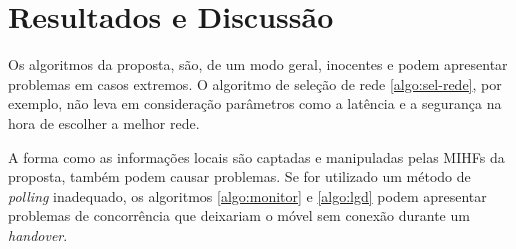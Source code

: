 \documentclass[12pt]{article}
\begin{document}
\section{Resultados e Discussão}

Os algoritmos da proposta, são, de um modo geral, inocentes e podem apresentar 
problemas em casos extremos. O algoritmo de seleção de rede 
\ref{algo:sel-rede}, por exemplo, não leva em consideração parâmetros como a 
latência e a segurança na hora de escolher a melhor rede.

A forma como as informações locais são captadas e manipuladas pelas MIHFs da 
proposta, também podem causar problemas. Se for utilizado um método de 
\textit{polling} inadequado, os algoritmos \ref{algo:monitor} e \ref{algo:lgd} 
podem apresentar problemas de concorrência que deixariam o móvel sem conexão 
durante um \textit{handover}.

\noindent\begin{minipage}[h]{\textwidth}
\end{minipage}
\end{document}
